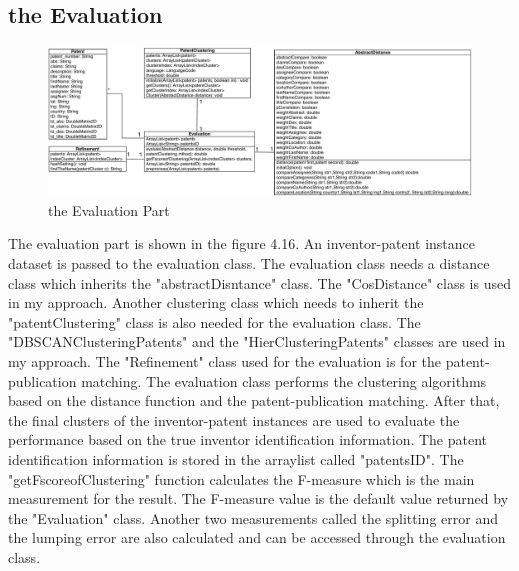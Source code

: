 \subsection{the Evaluation}
 \begin{figure}
\centering
\includegraphics[width=\headwidth]{evaluation.pdf}
\caption{the Evaluation Part}
\end{figure}
The evaluation part is shown in the figure 4.16. An inventor-patent instance dataset is passed to the evaluation class. The evaluation class needs a distance class which inherits the "abstractDisntance" class. The "CosDistance" class is used in my approach. Another clustering class which needs to inherit the "patentClustering" class is also needed for the evaluation class. The "DBSCANClusteringPatents" and the "HierClusteringPatents" classes are used in my approach. The "Refinement" class  used for the evaluation is for the patent-publication matching. The evaluation class performs the clustering algorithms based on the distance function and the patent-publication matching. After that, the final clusters of the inventor-patent instances are used to evaluate the performance based on the true inventor identification information. The patent identification information is stored in the arraylist called "patentsID". The "getFscoreofClustering" function calculates the F-measure which is the main measurement for the result. The F-measure value is the default value returned by the "Evaluation" class. Another two measurements called the splitting error and the lumping error are also calculated and can be accessed through the evaluation class.
 
